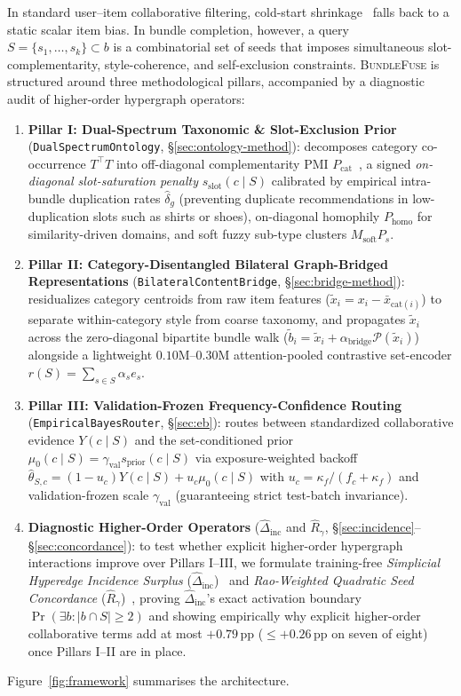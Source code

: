 In standard user--item collaborative filtering, cold-start shrinkage~\cite{bell2007,agarwal2009} falls back to a
static scalar item bias. In bundle completion, however, a query $S = \{s_1, \dots, s_k\} \subset b$ is a
combinatorial set of seeds that imposes simultaneous slot-complementarity, style-coherence, and self-exclusion
constraints. \textsc{BundleFuse} is structured around three methodological pillars, accompanied by a diagnostic audit of
higher-order hypergraph operators:
\begin{enumerate}\itemsep1pt
  \item \textbf{Pillar I: Dual-Spectrum Taxonomic \& Slot-Exclusion Prior} (\texttt{DualSpectrumOntology},
  \S\ref{sec:ontology-method}): decomposes category co-occurrence $T^{\!\top}T$ into off-diagonal complementarity
  PMI $P_{\text{cat}}$~\cite{mcauley}, a signed \emph{on-diagonal slot-saturation penalty} $s_{\text{slot}}(c\mid S)$
  calibrated by empirical intra-bundle duplication rates $\hat{\delta}_g$ (preventing duplicate recommendations in
  low-duplication slots such as shirts or shoes), on-diagonal homophily $P_{\text{homo}}$ for similarity-driven
  domains, and soft fuzzy sub-type clusters $M_{\text{soft}}P_s$.
  \item \textbf{Pillar II: Category-Disentangled Bilateral Graph-Bridged Representations}
  (\texttt{BilateralContentBridge}, \S\ref{sec:bridge-method}): residualizes category centroids from raw item
  features ($\tilde{x}_i = x_i - \bar{x}_{\text{cat}(i)}$) to separate within-category style from coarse taxonomy,
  and propagates $\tilde{x}_i$ across the zero-diagonal bipartite bundle walk ($\tilde{b}_i = \tilde{x}_i +
  \alpha_{\text{bridge}}\mathcal{P}(\tilde{x}_i)$) alongside a lightweight $0.10\text{M}$--$0.30\text{M}$
  attention-pooled contrastive set-encoder $r(S) = \sum_{s\in S}\alpha_s e_s$.
  \item \textbf{Pillar III: Validation-Frozen Frequency-Confidence Routing} (\texttt{EmpiricalBayesRouter},
  \S\ref{sec:eb}): routes between standardized collaborative evidence $Y(c\mid S)$ and the set-conditioned prior
  $\mu_0(c\mid S) = \gamma_{\text{val}} s_{\text{prior}}(c\mid S)$ via exposure-weighted backoff
  $\hat{\theta}_{S,c} = (1 - u_c)Y(c\mid S) + u_c\mu_0(c\mid S)$ with $u_c = \kappa_f / (f_c + \kappa_f)$ and
  validation-frozen scale $\gamma_{\text{val}}$ (guaranteeing strict test-batch invariance).
  \item \textbf{Diagnostic Higher-Order Operators} ($\hat{\Delta}_{\text{inc}}$ and $\hat{R}_{\gamma}$,
  \S\ref{sec:incidence}--\S\ref{sec:concordance}): to test whether explicit higher-order hypergraph interactions
  improve over Pillars I--III, we formulate training-free \emph{Simplicial Hyperedge Incidence Surplus}
  ($\hat{\Delta}_{\text{inc}}$)~\cite{benson2018,lee2024} and \emph{Rao-Weighted Quadratic Seed Concordance}
  ($\hat{R}_{\gamma}$)~\cite{rendle2010,blondel2016,rao1982}, proving $\hat{\Delta}_{\text{inc}}$'s exact
  activation boundary $\Pr(\exists b : \lvert b \cap S\rvert \ge 2)$ and showing empirically why explicit
  higher-order collaborative terms add at most $+0.79$\,pp (${\le}+0.26$\,pp on seven of eight) once Pillars I--II are in place.
\end{enumerate}
Figure~\ref{fig:framework} summarises the architecture.

